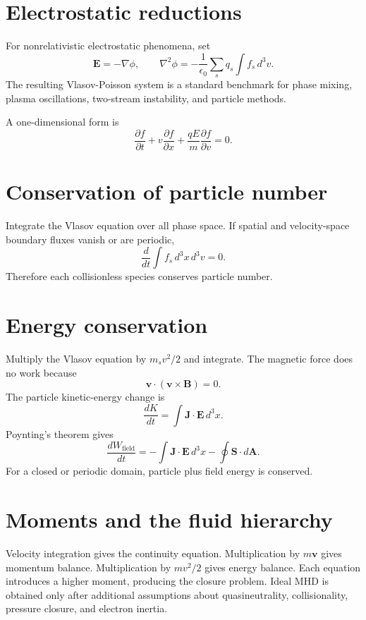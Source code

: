 \documentclass[11pt]{article}
\begin{document}
\section{Electrostatic reductions}
For nonrelativistic electrostatic phenomena, set
\begin{equation}
\mathbf E=-\nabla\phi,
\qquad
\nabla^2\phi=-\frac{1}{\epsilon_0}
\sum_s q_s\int f_s\,d^3v.
\end{equation}
The resulting Vlasov-Poisson system is a standard benchmark for phase mixing, plasma oscillations, two-stream instability, and particle methods.

A one-dimensional form is
\begin{equation}
\frac{\partial f}{\partial t}
+v\frac{\partial f}{\partial x}
+\frac{qE}{m}\frac{\partial f}{\partial v}=0.
\end{equation}

\section{Conservation of particle number}
Integrate the Vlasov equation over all phase space. If spatial and velocity-space boundary fluxes vanish or are periodic,
\begin{equation}
\frac{d}{dt}\int f_s\,d^3x\,d^3v=0.
\end{equation}
Therefore each collisionless species conserves particle number.

\section{Energy conservation}
Multiply the Vlasov equation by $m_sv^2/2$ and integrate. The magnetic force does no work because
\begin{equation}
\mathbf v\cdot(\mathbf v\times\mathbf B)=0.
\end{equation}
The particle kinetic-energy change is
\begin{equation}
\frac{dK}{dt}=\int\mathbf J\cdot\mathbf E\,d^3x.
\end{equation}
Poynting's theorem gives
\begin{equation}
\frac{dW_{\mathrm{field}}}{dt}
=-\int\mathbf J\cdot\mathbf E\,d^3x
-\oint\mathbf S\cdot d\mathbf A.
\end{equation}
For a closed or periodic domain, particle plus field energy is conserved.

\section{Moments and the fluid hierarchy}
Velocity integration gives the continuity equation. Multiplication by $m\mathbf v$ gives momentum balance. Multiplication by $mv^2/2$ gives energy balance. Each equation introduces a higher moment, producing the closure problem. Ideal MHD is obtained only after additional assumptions about quasineutrality, collisionality, pressure closure, and electron inertia.
\end{document}
